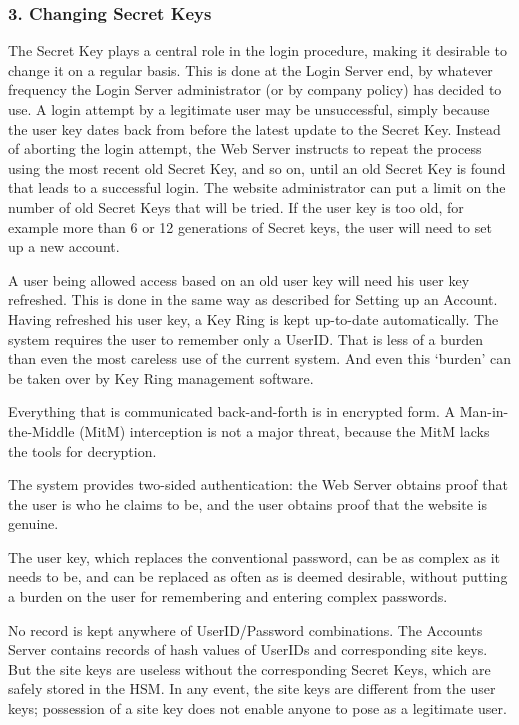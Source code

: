 \subsubsection{3. Changing Secret Keys}
The Secret Key plays a central role in the login procedure, making it desirable to change it on a regular basis.
This is done at the Login Server end, by whatever frequency the Login Server administrator (or by company policy) has decided to use.
A login attempt by a legitimate user may be unsuccessful, simply because the user key dates back from before the latest update to the Secret Key.
Instead of aborting the login attempt, the Web Server instructs to repeat the process using the most recent old Secret Key, and so on, until an old Secret Key is found that leads to a successful login.
The website administrator can put a limit on the number of old Secret Keys that will be tried.
If the user key is too old, for example more than 6 or 12 generations of Secret keys, the user will need to set up a new account.
\par
A user being allowed access based on an old user key will need his user key refreshed.
This is done in the same way as described for Setting up an Account.
Having refreshed his user key, a Key Ring is kept up-to-date automatically.
%
The \TIMO system requires the user to remember only a UserID.
That is less of a burden than even the most careless use of the current system.
And even this `burden' can be taken over by Key Ring management software.
\par
Everything that is communicated back-and-forth is in encrypted form.
A Man-in-the-Middle (MitM) interception is not a major threat,
because the MitM lacks the tools for decryption.
\par
The system provides two-sided authentication:
the Web Server obtains proof that the user is who he claims to be,
and the user obtains proof that the website is genuine.
\par
The user key, which replaces the conventional password, can be as complex as it needs to be, and can be replaced as often as is deemed desirable, without putting a burden on the user for remembering and entering complex passwords.
\par
No record is kept anywhere of UserID/Password combinations.
The Accounts Server contains records of hash values of UserIDs and corresponding site keys.
But the site keys are useless without the corresponding Secret Keys, which are safely stored in the HSM.
In any event, the site keys are different from the user keys; possession of a site key does not enable anyone to pose as a legitimate user.
